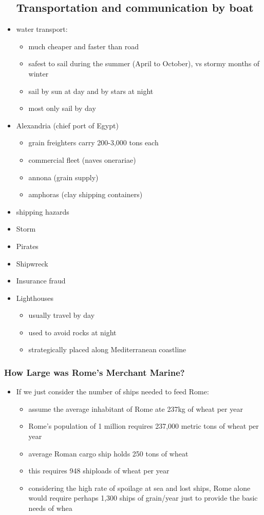 \documentclass[12pt, twoside]{article}
\begin{document}
\begin{itemize}
\subsection{Transportation and communication by boat}

\item water transport:
	\begin{itemize}
	\item much cheaper and faster than road
	\item safest to sail during the summer (April to October), vs stormy months of winter
	\item sail by sun at day and by stars at night
	\item most only sail by day
	\end{itemize}
\item Alexandria (chief port of Egypt)
	\begin{itemize}
	\item grain freighters carry 200-3,000 tons each
	\item commercial fleet (naves onerariae)
	\item annona (grain supply)
	\item amphoras (clay shipping containers)
	\end{itemize}
\item shipping hazards
\item Storm
\item Pirates
\item Shipwreck
\item Insurance fraud
\item Lighthouses
	\begin{itemize}
	\item  usually travel by day
	\item used to avoid rocks at night
	\item strategically placed along Mediterranean coastline
	\end{itemize}
\end{itemize}

\subsubsection{How Large was Rome’s Merchant Marine?}
\begin{itemize}
\item If we just consider the number of ships needed to feed Rome:
	\begin{itemize}
	\item assume the average inhabitant of Rome ate 237kg of wheat per year
	\item Rome’s population of 1 million requires 237,000 metric tons of wheat per year
	\item average Roman cargo ship holds 250 tons of wheat
	\item this requires 948 shiploads of wheat per year
	\item considering the high rate of spoilage at sea and lost ships, Rome alone would require perhaps 1,300 ships of grain/year just to provide the basic needs of whea
	\end{itemize}
\end{itemize}
\end{document}
